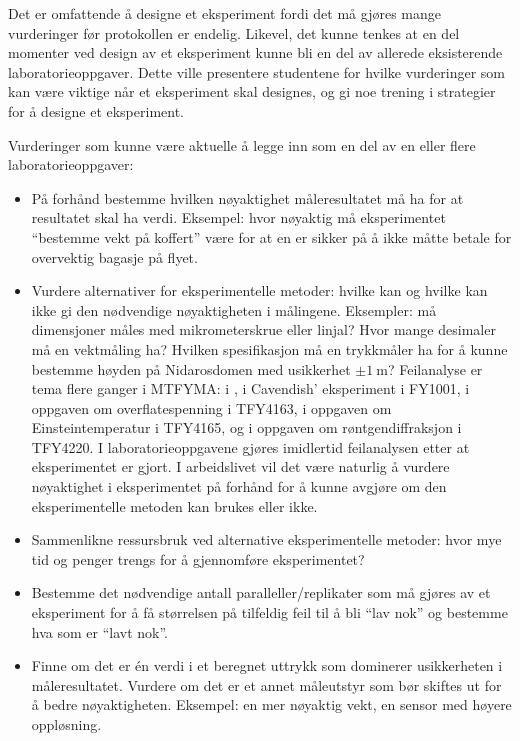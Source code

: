 \documentclass{article}
\begin{document}
Det er omfattende å designe et eksperiment fordi det må gjøres mange vurderinger før protokollen er endelig. Likevel, det kunne tenkes at en del momenter ved design av et eksperiment kunne bli en del av allerede eksisterende laboratorieoppgaver. Dette ville presentere studentene for hvilke vurderinger som kan være viktige når et eksperiment skal designes, og gi noe trening i strategier for å designe et eksperiment.

Vurderinger som kunne være aktuelle å legge inn som en del av en eller flere laboratorieoppgaver:
\begin{itemize}
  \item På forhånd bestemme hvilken nøyaktighet måleresultatet må ha for at resultatet skal ha verdi. Eksempel: hvor nøyaktig må eksperimentet ``bestemme vekt på koffert'' være for at en er sikker på å ikke måtte betale for overvektig bagasje på flyet.

  \item Vurdere alternativer for eksperimentelle metoder: hvilke kan og hvilke kan ikke gi den nødvendige nøyaktigheten i målingene. Eksempler: må dimensjoner måles med mikrometerskrue eller linjal? Hvor mange desimaler må en vektmåling ha? Hvilken spesifikasjon må en trykkmåler ha for å kunne bestemme høyden på Nidarosdomen med usikkerhet $\pm\SI{1}{\meter}$? Feilanalyse er tema flere ganger i MTFYMA: i \cite{Persson2020}, i Cavendish’ eksperiment i FY1001, i oppgaven om overflatespenning i TFY4163, i oppgaven om Einsteintemperatur i TFY4165, og i oppgaven om røntgendiffraksjon i TFY4220. I laboratorieoppgavene gjøres imidlertid feilanalysen etter at eksperimentet er gjort. I arbeidslivet vil det være naturlig å vurdere nøyaktighet i eksperimentet på forhånd for å kunne avgjøre om den eksperimentelle metoden kan brukes eller ikke.

  \item Sammenlikne ressursbruk ved alternative eksperimentelle metoder: hvor mye tid og penger trengs for å gjennomføre eksperimentet?

  \item Bestemme det nødvendige antall paralleller/replikater som må gjøres av et eksperiment for å få størrelsen på tilfeldig feil til å bli ``lav nok'' og bestemme hva som er ``lavt nok''.

  \item Finne om det er én verdi i et beregnet uttrykk som dominerer usikkerheten i måleresultatet. Vurdere om det er et annet måleutstyr som bør skiftes ut for å bedre nøyaktigheten. Eksempel: en mer nøyaktig vekt, en sensor med høyere oppløsning.


\end{itemize}
\end{document}
